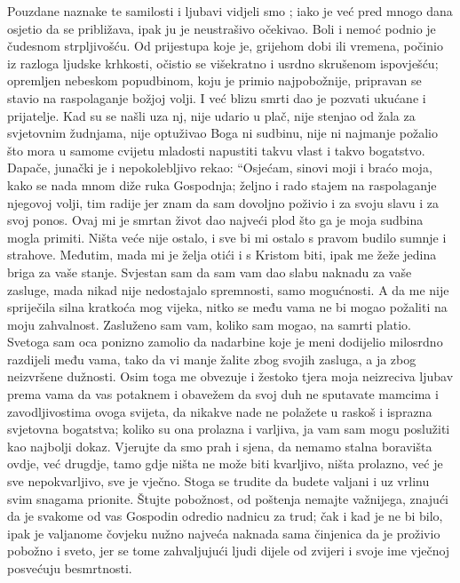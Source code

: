 \documentclass[a5paper,twoside]{article}
\begin{document}
\pend
\pstart
Pouzdane naznake te samilosti i ljubavi vidjeli smo ; iako je već pred mnogo dana osjetio da se približava, ipak ju je neustrašivo očekivao.  Boli i nemoć podnio je čudesnom strpljivošću.  Od prijestupa koje je, grijehom dobi ili vremena, počinio iz razloga ljudske krhkosti, očistio se višekratno i usrdno skrušenom ispovješću; opremljen nebeskom popudbinom, koju je primio najpobožnije, pripravan se stavio na raspolaganje božjoj volji.  I već blizu smrti dao je pozvati ukućane i prijatelje. Kad su se našli uza nj, nije udario u plač, nije stenjao od žala za svjetovnim žudnjama, nije optuživao Boga ni sudbinu, nije ni najmanje požalio što mora u samome cvijetu mladosti napustiti takvu vlast i takvo bogatstvo. Dapače, junački je i nepokolebljivo rekao: ``Osjećam, sinovi moji i braćo moja, kako se nada mnom diže ruka Gospodnja; željno i rado stajem na raspolaganje njegovoj volji, tim radije jer znam da sam dovoljno poživio i za svoju slavu i za svoj ponos.  Ovaj mi je smrtan život dao najveći plod što ga je moja sudbina mogla primiti. Ništa veće nije ostalo, i sve bi mi ostalo s pravom budilo sumnje i strahove.  Međutim, mada mi je želja otići i s Kristom biti, ipak me žeže jedina briga za vaše stanje. Svjestan sam da sam vam dao slabu naknadu za vaše zasluge, mada nikad nije nedostajalo spremnosti, samo mogućnosti.  A da me nije spriječila silna kratkoća mog vijeka, nitko se među vama ne bi mogao požaliti na moju zahvalnost.  Zasluženo sam vam, koliko sam mogao, na samrti platio. Svetoga sam oca ponizno zamolio da nadarbine koje je meni dodijelio milosrdno razdijeli među vama, tako da vi manje žalite zbog svojih zasluga, a ja zbog neizvršene dužnosti.  Osim toga me obvezuje i žestoko tjera moja neizreciva ljubav prema vama da vas potaknem i obavežem da svoj duh ne sputavate mamcima i zavodljivostima ovoga svijeta, da nikakve nade ne polažete u raskoš i isprazna svjetovna bogatstva; koliko su ona prolazna i varljiva, ja vam sam mogu poslužiti kao najbolji dokaz.  Vjerujte da smo prah i sjena, da nemamo stalna boravišta ovdje, već drugdje, tamo gdje ništa ne može biti kvarljivo, ništa prolazno, već je sve nepokvarljivo, sve je vječno.  Stoga se trudite da budete valjani i uz vrlinu svim snagama prionite. Štujte pobožnost, od poštenja nemajte važnijega, znajući da je svakome od vas Gospodin odredio nadnicu za trud; čak i kad je ne bi bilo, ipak je valjanome čovjeku nužno najveća naknada sama činjenica da je proživio pobožno i sveto, jer se tome zahvaljujući ljudi dijele od zvijeri i svoje ime vječnoj posvećuju besmrtnosti. 
\end{document}
